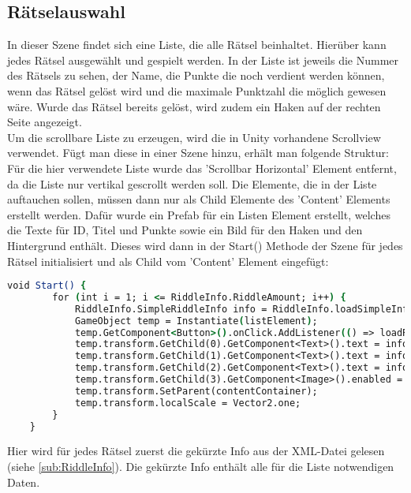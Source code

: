 {\subsection{Rätselauswahl}
In dieser Szene findet sich eine Liste, die alle Rätsel beinhaltet. Hierüber kann jedes Rätsel ausgewählt und gespielt werden.
In der Liste ist jeweils die Nummer des Rätsels zu sehen, der Name, die Punkte die noch verdient werden können, wenn das Rätsel gelöst wird und die maximale Punktzahl die möglich gewesen wäre. Wurde das Rätsel bereits gelöst, wird zudem ein Haken auf der rechten Seite angezeigt.\\
Um die scrollbare Liste zu erzeugen, wird die in Unity vorhandene Scrollview verwendet.
Fügt man diese in einer Szene hinzu, erhält man folgende Struktur:
Für die hier verwendete Liste wurde das 'Scrollbar Horizontal' Element entfernt, da die Liste nur vertikal gescrollt werden soll. Die Elemente, die in der Liste auftauchen sollen, müssen dann nur als Child Elemente des 'Content' Elements erstellt werden. Dafür wurde ein Prefab für ein Listen Element erstellt, welches die Texte für ID, Titel und Punkte sowie ein Bild für den Haken und den Hintergrund enthält. Dieses wird dann in der Start() Methode der Szene für jedes Rätsel initialisiert und als Child vom 'Content' Element eingefügt:
\begin{lstlisting}[language=csh, caption={Start Methode der Rätsel Liste, welche die Listenelemente erstellt}]
void Start() {
        for (int i = 1; i <= RiddleInfo.RiddleAmount; i++) {
            RiddleInfo.SimpleRiddleInfo info = RiddleInfo.loadSimpleInfoFromXML(i);
            GameObject temp = Instantiate(listElement);
            temp.GetComponent<Button>().onClick.AddListener(() => loadRiddleScene(info.id));
            temp.transform.GetChild(0).GetComponent<Text>().text = info.id.ToString("000");
            temp.transform.GetChild(1).GetComponent<Text>().text = info.title;
            temp.transform.GetChild(2).GetComponent<Text>().text = info.points + "/" + info.maxPoints;
            temp.transform.GetChild(3).GetComponent<Image>().enabled = info.completed;
            temp.transform.SetParent(contentContainer);
            temp.transform.localScale = Vector2.one;
        }
    }
\end{lstlisting}
Hier wird für jedes Rätsel zuerst die gekürzte Info aus der XML-Datei gelesen (siehe \ref{sub:RiddleInfo}). Die gekürzte Info enthält alle für die Liste notwendigen Daten.
}
